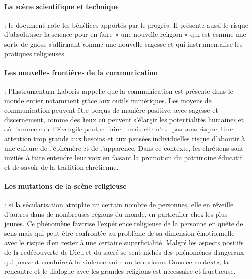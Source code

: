 \paragraph{La scène scientifique et technique}
 : le document note les bénéfices apportés par le progrès. Il
présente aussi le risque d’absolutiser la science pour en faire « une nouvelle religion » qui est comme
une sorte de gnose s’affirmant comme une nouvelle sagesse et qui instrumentalise les pratiques
religieuses.
 
\paragraph{Les nouvelles frontières de la communication }
: l’Instrumentum Laboris rappelle que la
communication est présente dans le monde entier notamment grâce aux outils numériques. Les
moyens de communication peuvent être perçus de manière positive, avec sagesse et discernement,
comme des lieux où peuvent s’élargir les potentialités humaines et où l’annonce de l’Evangile peut
se faire… mais elle n’est pas sans risque. Une attention trop grande aux besoins et aux pensées
individuelles risque d’aboutir à une culture de l’éphémère et de l’apparence. Dans ce contexte, les
chrétiens sont invités à faire entendre leur voix en faisant la promotion du patrimoine éducatif et de
savoir de la tradition chrétienne.
\paragraph{Les mutations de la scène religieuse }
: si la sécularisation atrophie un certain nombre de personnes,
elle en réveille d’autres dans de nombreuses régions du monde, en particulier chez les plus jeunes.
Ce phénomène favorise l’expérience religieuse de la personne en quête de sens mais qui peut être
confrontée au problème de sa dimension émotionnelle avec le risque d’en rester à une certaine
superficialité. Malgré les aspects positifs de la redécouverte de Dieu et du sacré se sont nichés des
phénomènes dangereux qui peuvent conduire à la violence voire au terrorisme. Dans ce contexte, la
rencontre et le dialogue avec les grandes religions est nécessaire et fructueuse.
